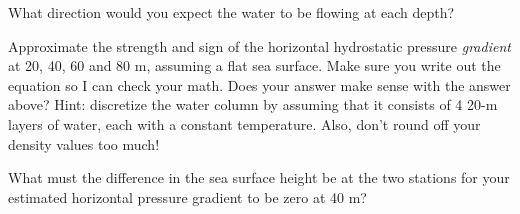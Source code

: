 What direction would you expect the water to be flowing at each depth?

Approximate the strength and sign of the horizontal hydrostatic pressure \emph{gradient} at 20, 40, 60 and 80 m, assuming a flat sea surface. Make sure you write out the equation so I can check your math. Does your answer make sense with the answer above? Hint: discretize the water column by assuming that it consists of 4 20-m layers of water, each with a constant temperature. Also, don't round off your density values too much!

What must the difference in the sea surface height be at the two stations for your estimated horizontal pressure gradient to be zero at 40 m?

